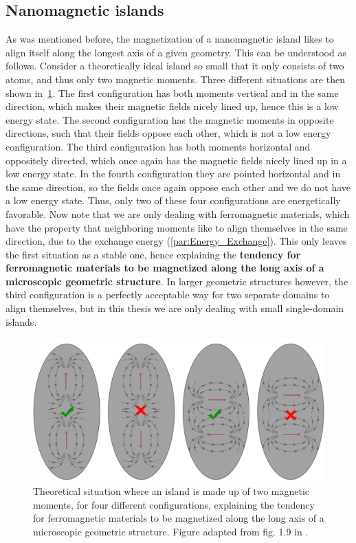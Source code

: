 \documentclass[11pt,a4paper,english]{article}
\begin{document}
\subsection{Nanomagnetic islands}
\label{par:Intro_nanomagnetic-islands}
As was mentioned before, the magnetization of a nanomagnetic island likes to align itself along the longest axis of a given geometry. This can be understood as follows. Consider a theoretically ideal island so small that it only consists of two atoms, and thus only two magnetic moments. Three different situations are then shown in~\cref{fig:Intro_IslandEllipticPreferredDirection}.
The first configuration has both moments vertical and in the same direction, which makes their magnetic fields nicely lined up, hence this is a low energy state. The second configuration has the magnetic moments in opposite directions, such that their fields oppose each other, which is not a low energy configuration. The third configuration has both moments horizontal and oppositely directed, which once again has the magnetic fields nicely lined up in a low energy state. In the fourth configuration they are pointed horizontal and in the same direction, so the fields once again oppose each other and we do not have a low energy state. Thus, only two of these four configurations are energetically favorable. Now note that we are only dealing with ferromagnetic materials, which have the property that neighboring moments like to align themselves in the same direction, due to the exchange energy (\cref{par:Energy_Exchange}). This only leaves the first situation as a stable one, hence explaining the \textbf{tendency for ferromagnetic materials to be magnetized along the long axis of a microscopic geometric structure}. In larger geometric structures however, the third configuration is a perfectly acceptable way for two separate domains to align themselves, but in this thesis we are only dealing with small single-domain islands. \par
\begin{figure}[t]
    \centering
    \includegraphics[width=0.8\columnwidth]{Figures/Introduction/NML_Carlton - Figure 1.9 adapted.png}
    \caption{Theoretical situation where an island is made up of two magnetic moments, for four different configurations, explaining the tendency for ferromagnetic materials to be magnetized along the long axis of a microscopic geometric structure. Figure adapted from fig. 1.9 in \cite{NML_Carlton}.}
    \label{fig:Intro_IslandEllipticPreferredDirection}
\end{figure}
\end{document}

